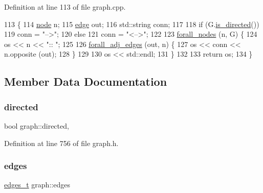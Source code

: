 Definition at line 113 of file graph.\+cpp.


\begin{DoxyCode}
113                                                                    \{
114     \mbox{\hyperlink{classnode}{node}} n;
115     \mbox{\hyperlink{classedge}{edge}} out;
116     std::string conn;
117 
118     \textcolor{keywordflow}{if} (G.\mbox{\hyperlink{classgraph_afc510be7479fa903fde9e0e615470ab0}{is\_directed}}()) 
119     conn = \textcolor{stringliteral}{"-->"}; 
120     \textcolor{keywordflow}{else} 
121     conn = \textcolor{stringliteral}{"<-->"}; 
122 
123     \mbox{\hyperlink{graph_8h_a1905bf4c6aa7167b9ee5a2e72f12ad2d}{forall\_nodes}} (n, G) \{
124     os << n << \textcolor{stringliteral}{":: "};
125 
126     \mbox{\hyperlink{node_8h_ae53910b86f6343c6d82c56aad0107e0b}{forall\_adj\_edges}} (out, n) \{
127         os << conn << n.opposite (out);
128     \}
129     
130     os << std::endl;
131     \}
132     
133     \textcolor{keywordflow}{return}  os;
134 \}
\end{DoxyCode}


\subsection{Member Data Documentation}
\mbox{\label{classgraph_ab4120df210eb3d03d20b0bd27f8cbe8c}} 
\subsubsection{\texorpdfstring{directed}{directed}}
{\footnotesize\ttfamily bool graph\+::directed\hspace{0.3cm}{\ttfamily [mutable]}, {\ttfamily [private]}}



Definition at line 756 of file graph.\+h.

\mbox{\label{classgraph_ab5b1c610cca1bcf72b05aacc28a48153}} 
\subsubsection{\texorpdfstring{edges}{edges}}
{\footnotesize\ttfamily \mbox{\hyperlink{edge_8h_a8f9587479bda6cf612c103494b3858e3}{edges\+\_\+t}} graph\+::edges\hspace{0.3cm}{\ttfamily [private]}}



